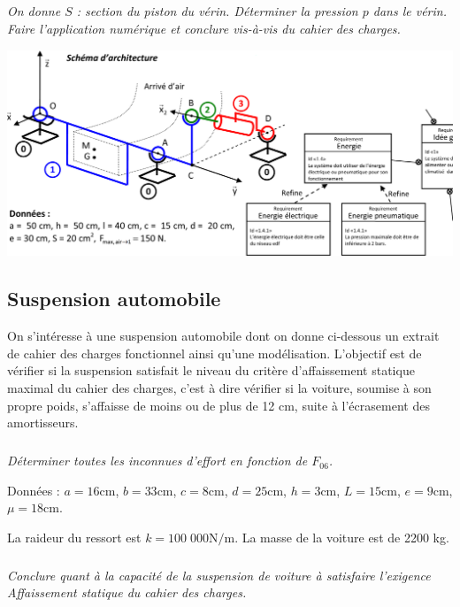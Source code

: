\documentclass[10pt,fleqn]{article} %
\begin{document}
\begin{multicols}{2}
\subparagraph{}
\textit{On donne $S$ : section du piston du vérin. Déterminer la pression $p$ dans le vérin. Faire l’application numérique et conclure vis-à-vis du cahier des charges.}



\ifprof
\else
\end{multicols}
\fi

\begin{center}
\includegraphics[width=.95\linewidth]{images/img2}
\end{center}

\newpage
\begin{multicols}{2}

\subsection*{Suspension automobile}
\setcounter{exo}{0}


On s'intéresse à une suspension automobile dont on donne ci-dessous un extrait de cahier des charges fonctionnel ainsi qu’une modélisation. L'objectif est de vérifier si la suspension satisfait le niveau du critère d'affaissement statique maximal du cahier des charges, c'est à dire vérifier si la voiture, soumise à son propre poids, s'affaisse de moins ou de plus de 12 cm, suite à l'écrasement des amortisseurs. 


%
%
%
%
%


\subparagraph{}
\textit{Déterminer toutes les inconnues d'effort en fonction de $F_{06}$.}

Données : $a = 16 \text{cm}$, $b = 33 \text{cm}$, $c = 8 \text{cm}$, $d = 25 \text{cm}$, $h = 3 \text{cm}$, $L = 15 \text{cm}$, $e = 9 \text{cm}$, $\mu = 18 \text{cm}$. 

La raideur du ressort est $k = 100\;000 \text{N/m}$. La masse de la voiture est de 2200 kg.

\subparagraph{}
\textit{Conclure quant à la capacité de la suspension de voiture à satisfaire l’exigence Affaissement statique du cahier des charges. }

\end{multicols}
\end{document}
